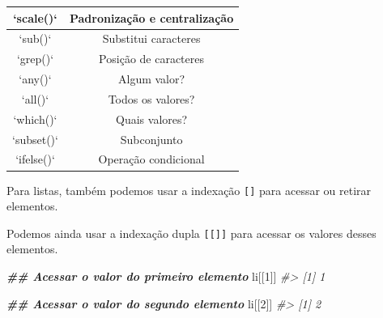 \documentclass[
]{book}
\newenvironment{Shaded}{\begin{snugshade}}{\end{snugshade}}
\newcommand{\AttributeTok}[1]{\textcolor[rgb]{0.61,0.61,0.61}{#1}}
\newcommand{\CommentTok}[1]{\textcolor[rgb]{0.37,0.37,0.37}{\textit{#1}}}
\newcommand{\DecValTok}[1]{\textcolor[rgb]{0.06,0.06,0.06}{#1}}
\newcommand{\DocumentationTok}[1]{\textcolor[rgb]{0.37,0.37,0.37}{\textbf{\textit{#1}}}}
\newcommand{\FunctionTok}[1]{\textcolor[rgb]{0,0,0}{#1}}
\newcommand{\NormalTok}[1]{#1}
\newcommand{\OtherTok}[1]{\textcolor[rgb]{0.37,0.37,0.37}{#1}}
\newcommand{\SpecialCharTok}[1]{\textcolor[rgb]{0,0,0}{#1}}
\begin{document}
\begin{table}
\begin{tabular}[t]{c|c}
\hline
`scale()` & Padronização e centralização\\
\hline
`sub()` & Substitui caracteres\\
\hline
`grep()` & Posição de caracteres\\
\hline
`any()` & Algum valor?\\
\hline
`all()` & Todos os valores?\\
\hline
`which()` & Quais valores?\\
\hline
`subset()` & Subconjunto\\
\hline
`ifelse()` & Operação condicional\\
\hline
\end{tabular}
\end{table}

Para listas, também podemos usar a indexação \texttt{{[}{]}} para acessar ou retirar elementos.

\begin{Shaded}
\end{Shaded}

Podemos ainda usar a indexação dupla \texttt{{[}{[}{]}{]}} para acessar os valores desses elementos.

\begin{Shaded}
\begin{Highlighting}[]
\DocumentationTok{\#\# Acessar o valor do primeiro elemento}
\NormalTok{li[[}\DecValTok{1}\NormalTok{]]}
\CommentTok{\#\textgreater{} [1] 1}

\DocumentationTok{\#\# Acessar o valor do segundo elemento}
\NormalTok{li[[}\DecValTok{2}\NormalTok{]]}
\CommentTok{\#\textgreater{} [1] 2}
\end{Highlighting}
\end{Shaded}
\end{document}
